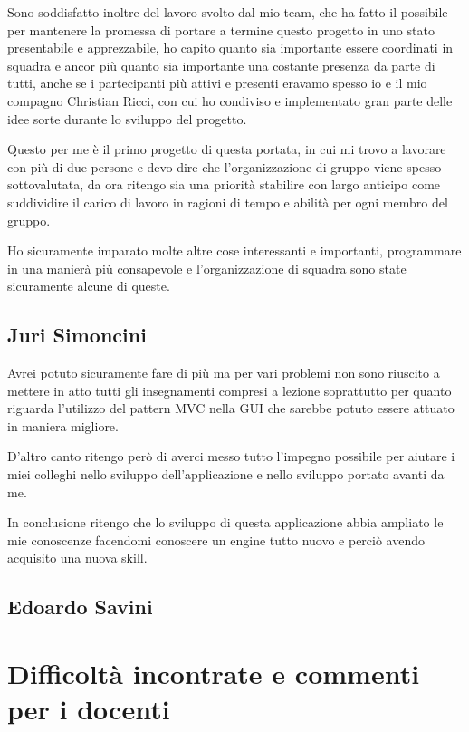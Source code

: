 Sono soddisfatto inoltre del lavoro svolto dal mio team, che ha fatto il possibile per mantenere la promessa di portare a termine questo progetto in uno stato presentabile e apprezzabile, ho capito quanto sia importante essere coordinati in squadra e ancor più quanto sia importante una costante presenza da parte di tutti, anche se i partecipanti più attivi e presenti eravamo spesso io e il mio compagno Christian Ricci, con cui ho condiviso e implementato gran parte delle idee sorte durante lo sviluppo del progetto.   

Questo per me è il primo progetto di questa portata, in cui mi trovo a lavorare con più di due persone e devo dire che l'organizzazione di gruppo viene spesso sottovalutata, da ora ritengo sia una priorità stabilire con largo anticipo come suddividire il carico di lavoro in ragioni di tempo e abilità per ogni membro del gruppo.

Ho sicuramente imparato molte altre cose interessanti e importanti, programmare in una manierà più consapevole e l'organizzazione di squadra sono state sicuramente alcune di queste.

\subsection{Juri Simoncini}

Avrei potuto sicuramente fare di più ma per vari problemi non sono riuscito a mettere in atto tutti gli insegnamenti compresi a lezione soprattutto per quanto riguarda l'utilizzo del pattern MVC nella GUI che sarebbe potuto essere attuato in maniera migliore.

D'altro canto ritengo però di averci messo tutto l'impegno possibile per aiutare i miei colleghi nello sviluppo dell'applicazione e nello sviluppo portato avanti da me.

In conclusione ritengo che lo sviluppo di questa applicazione abbia ampliato le mie conoscenze facendomi conoscere un engine tutto nuovo e perciò avendo acquisito una nuova skill.

\subsection{Edoardo Savini}

\section{Difficoltà incontrate e commenti per i docenti}

